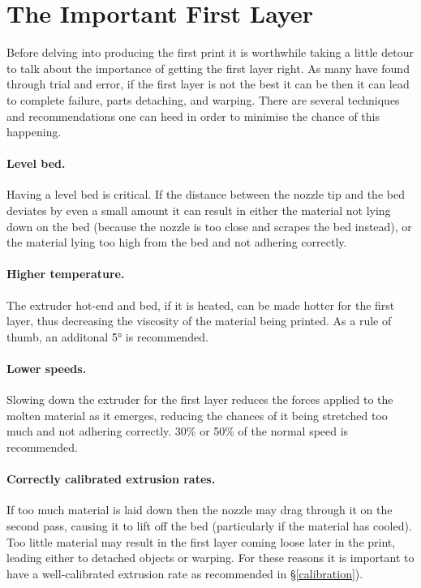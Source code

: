 
\section{The Important First Layer}
\label{sec:the_important_first_layer}
Before delving into producing the first print it is worthwhile taking a little detour to talk about the importance of getting the first layer right.  As many have found through trial and error, if the first layer is not the best it can be then it can lead to complete failure, parts detaching, and warping.  There are several techniques and recommendations one can heed in order to minimise the chance of this happening.

\paragraph{Level bed.} %
\label{par:level_bed}
Having a level bed is critical.  If the distance between the nozzle tip and the bed deviates by even a small amount it can result in either the material not lying down on the bed (because the nozzle is too close and scrapes the bed instead), or the material lying too high from the bed and not adhering correctly.

\paragraph{Higher temperature.} %
\label{par:higher_temperature}
The extruder hot-end and bed, if it is heated, can be made hotter for the first layer, thus decreasing the viscosity of the material being printed.  As a rule of thumb, an additonal 5° is recommended.

\paragraph{Lower speeds.} %
\label{par:lower_speeds}
Slowing down the extruder for the first layer reduces the forces applied to the molten material as it emerges, reducing the chances of it being stretched too much and not adhering correctly.  30\% or 50\% of the normal speed is recommended.

\paragraph{Correctly calibrated extrusion rates.} %
\label{par:correct_extrusion_settings}
If too much material is laid down then the nozzle may drag through it on the second pass, causing it to lift off the bed (particularly if the material has cooled).  Too little material may result in the first layer coming loose later in the print, leading either to detached objects or warping.  For these reasons it is important to have a well-calibrated extrusion rate as recommended in §\ref{calibration}).

